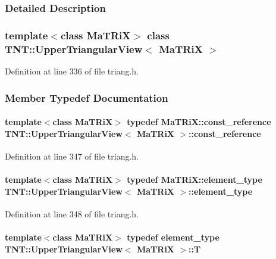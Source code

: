 \subsubsection{Detailed Description}
\subsubsection*{template$<$class MaTRiX$>$ class TNT::UpperTriangularView$<$ MaTRiX $>$}



Definition at line 336 of file triang.h.



\subsubsection{Member Typedef Documentation}
\paragraph[{const\_\-reference}]{\setlength{\rightskip}{0pt plus 5cm}template$<$class MaTRiX$>$ typedef MaTRiX::const\_\-reference {\bf TNT::UpperTriangularView}$<$ MaTRiX $>$::{\bf const\_\-reference}}\hfill\label{class_t_n_t_1_1_upper_triangular_view_aff1028a5fbca2d7cddb5a62809da560e}


Definition at line 347 of file triang.h.

\paragraph[{element\_\-type}]{\setlength{\rightskip}{0pt plus 5cm}template$<$class MaTRiX$>$ typedef MaTRiX::element\_\-type {\bf TNT::UpperTriangularView}$<$ MaTRiX $>$::{\bf element\_\-type}}\hfill\label{class_t_n_t_1_1_upper_triangular_view_afa870480432586c7887f51a82099688f}


Definition at line 348 of file triang.h.

\paragraph[{T}]{\setlength{\rightskip}{0pt plus 5cm}template$<$class MaTRiX$>$ typedef {\bf element\_\-type} {\bf TNT::UpperTriangularView}$<$ MaTRiX $>$::{\bf T}}\hfill\label{class_t_n_t_1_1_upper_triangular_view_a7b7340647274183694dd2729e1993aea}


